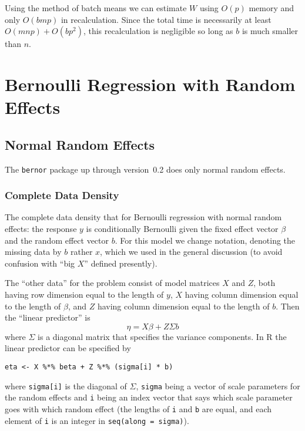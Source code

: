 \documentclass{article}
\begin{document}
Using the method of batch means we can estimate $W$ using $O(p)$ memory
and only $O(b m p)$ in recalculation.  Since the total time is necessarily
at least $O(m n p) + O(b p^2)$, this recalculation is negligible so long
as $b$ is much smaller than $n$.

\section{Bernoulli Regression with Random Effects}

\subsection{Normal Random Effects}

The \texttt{bernor} package up through version~0.2 does only
normal random effects.

\subsubsection{Complete Data Density}

The complete data density that for Bernoulli regression
with normal random effects: the response $y$ is conditionally Bernoulli
given the fixed effect vector $\beta$ and the random effect vector $b$.
For this model we change notation, denoting the missing data by $b$ rather $x$,
which we used in the general discussion (to avoid confusion with
``big $X$'' defined presently).

The ``other data'' for the problem consist of model matrices $X$ and $Z$,
both having row dimension equal to the length of $y$,
$X$ having column dimension equal to the length of $\beta$,
and $Z$ having column dimension equal to the length of $b$.
Then the ``linear predictor'' is
\begin{equation} \label{eq:eta}
   \eta = X \beta + Z \Sigma b
\end{equation}
where $\Sigma$ is a diagonal matrix that specifies the variance components.
In R the linear predictor can be specified by
\begin{verbatim}
eta <- X %*% beta + Z %*% (sigma[i] * b)
\end{verbatim}
where \texttt{sigma[i]} is the diagonal of $\Sigma$, \texttt{sigma} being
a vector of scale parameters for the random effects and \texttt{i} being
an index vector that says which scale parameter goes with which random effect
(the lengths of \texttt{i} and \texttt{b} are equal, and each element of
\texttt{i} is an integer in \texttt{seq(along = sigma)}).
\end{document}
